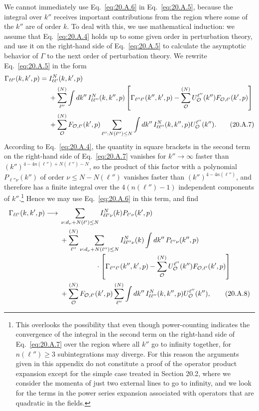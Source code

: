 We cannot immediately use Eq.~\eqref{eq:20.A.6} in Eq.~\eqref{eq:20.A.5}, because the integral over $k''$ receives important contributions from the region where some of the $k''$ are of order $k$. To deal with this, we use mathematical induction: we assume that Eq.~\eqref{eq:20.A.4} holds up to some given order in perturbation theory, and use it on the right-hand side of Eq.~\eqref{eq:20.A.5} to calculate the asymptotic behavior of $\Gamma$ to the next order of perturbation theory. We rewrite Eq.~\eqref{eq:20.A.5} in the form
\begin{align}
\Gamma_{\ell\ell'}(k,k',p)
={}&I_{\ell\ell'}^N(k,k',p)
\notag\\
&+\sum_{\ell''}^{(N)}
\int dk''\,I_{\ell\ell''}^N(k,k'',p)
\left[
\Gamma_{\ell''\ell'}(k'',k',p)
-\sum_{\mathcal O}^{(N)}
U_{\mathcal O}^{\ell''}(k'')
F_{\mathcal O,\ell'}(k',p)
\right]
\notag\\
&+\sum_{\mathcal O}^{(N)}
F_{\mathcal O,\ell'}(k',p)
\sum_{\ell'':N(\ell'')\leq N}
\int dk''\,I_{\ell\ell''}^N(k,k'',p)
U_{\mathcal O}^{\ell''}(k'').
\tag{20.A.7}\label{eq:20.A.7}
\end{align}
According to Eq.~\eqref{eq:20.A.4}, the quantity in square brackets in the second term on the right-hand side of Eq.~\eqref{eq:20.A.7} vanishes for $k''\to\infty$ faster than $(k'')^{4-4n(\ell'')+N(\ell'')-N}$, so the product of this factor with a polynomial $P_{\ell''\nu}(k'')$ of order $\nu\leq N-N(\ell'')$ vanishes faster than $(k'')^{4-4n(\ell'')}$, and therefore has a finite integral over the $4(n(\ell'')-1)$ independent components of $k''$.\footnote{This overlooks the possibility that even though power-counting indicates the convergence of the integral in the second term on the right-hand side of Eq.~\eqref{eq:20.A.7} over the region where all $k''$ go to infinity together, for $n(\ell'')\geq3$ subintegrations may diverge. For this reason the arguments given in this appendix do not constitute a proof of the operator product expansion except for the simple case treated in Section 20.2, where we consider the momenta of just two external lines to go to infinity, and we look for the terms in the power series expansion associated with operators that are quadratic in the fields.} Hence we may use Eq.~\eqref{eq:20.A.6} in this term, and find
\begingroup
\allowdisplaybreaks[0]
\begin{align}
\Gamma_{\ell\ell'}(k,k',p)
\longrightarrow{}&
\sum_{\nu:d_\nu+N(\ell')\leq N}
I_{\ell\ell'\nu}^N(k)
P_{\ell'\nu}(k',p)
\notag\\
&+\sum_{\ell''}^{(N)}
\sum_{\nu:d_\nu+N(\ell'')\leq N}
I_{\ell\ell''\nu}^N(k)
\int dk''\,P_{\ell''\nu}(k'',p)
\notag\\[-2pt]
&\hspace{18mm}\cdot
\left[
\Gamma_{\ell''\ell'}(k'',k',p)
-\sum_{\mathcal O}^{(N)}
U_{\mathcal O}^{\ell''}(k'')
F_{\mathcal O,\ell'}(k',p)
\right]
\notag\\
&+\sum_{\mathcal O}^{(N)}
F_{\mathcal O,\ell'}(k',p)
\sum_{\ell''}^{(N)}
\int dk''\,I_{\ell\ell''}^N(k,k'',p)
U_{\mathcal O}^{\ell''}(k''),
\tag{20.A.8}\label{eq:20.A.8}
\end{align}
